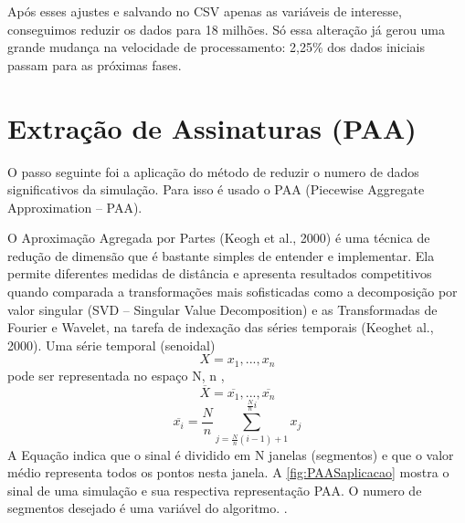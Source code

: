 Após esses ajustes e salvando no CSV apenas as variáveis de interesse, conseguimos reduzir os dados para 18 milhões. Só essa alteração já gerou uma grande mudança na velocidade de processamento:  2,25\% dos dados iniciais passam para as próximas fases.
 

\section{\textbf{Extração de Assinaturas (PAA)}}

O passo seguinte foi a aplicação do método de reduzir o numero de dados significativos da simulação. Para isso é usado o PAA (Piecewise Aggregate Approximation – PAA). 

O Aproximação Agregada por Partes (Keogh et al., 2000) é uma técnica de redução de dimensão que é bastante simples de entender e implementar. Ela permite diferentes medidas de distância e apresenta resultados competitivos quando comparada a transformações mais sofisticadas como a decomposição por valor singular (SVD – Singular Value Decomposition) e as Transformadas de Fourier e Wavelet, na tarefa de indexação das séries temporais (Keoghet al., 2000). Uma série temporal (senoidal)
\begin{equation}
X=x_{1},...,x_{n} \end{equation} pode ser representada no espaço N, n \leqslantn ,
\begin{equation}
\overline{X}=\overline{x_{1}},...,\overline{x_{n}}
\end{equation}
\begin{equation}
\overline{x_{i}}= \frac{N}{n}\sum_{j=\frac{N}{n}(i-1)+1}^{\frac{N}{n}i}x_{j}
\end{equation}
A Equação indica que o sinal é dividido em N janelas (segmentos) e que o valor médio representa todos os pontos nesta janela. A \ref{fig:PAASaplicacao} mostra o sinal de uma simulação e sua respectiva representação PAA. O numero de segmentos desejado é uma variável do algoritmo. \cite{timeSerial}. 

